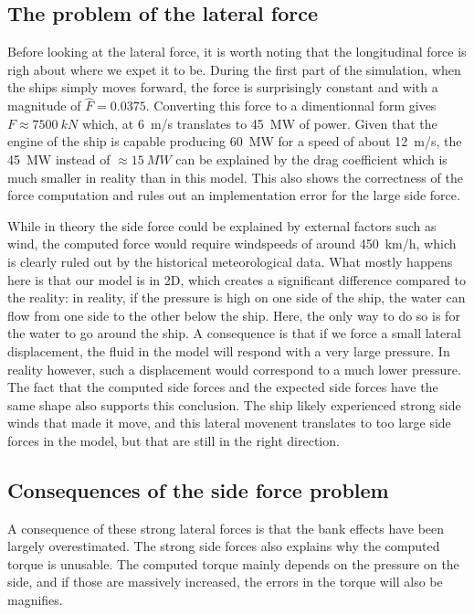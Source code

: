 \documentclass[a4paper]{article}
\begin{document}
\subsection{The problem of the lateral force}
Before looking at the lateral force, it is worth noting that the longitudinal force is righ about where we expet it to be. During the first part of the simulation, when the ships simply moves forward, the force is surprisingly constant and with a magnitude of $\hat{F} = 0.0375$. Converting this force to a dimentionnal form gives $F \approx \SI{7500}{kN}$ which, at \SI{6}{m/s} translates to \SI{45}{MW} of power. Given that the engine of the ship is capable producing \SI{60}{MW} for a speed of about \SI{12}{m/s}, the \SI{45}{MW} instead of $\approx \SI{15}{MW}$ can be explained by the drag coefficient which is much smaller in reality than in this model. This also shows the correctness of the force computation and rules out an implementation error for the large side force.

While in theory the side force could be explained by external factors such as wind, the computed force would require windspeeds of around \SI{450}{km/h}, which is clearly ruled out by the historical meteorological data. What mostly happens here is that our model is in 2D, which creates a significant difference compared to the reality: in reality, if the pressure is high on one side of the ship, the water can flow from one side to the other below the ship. Here, the only way to do so is for the water to go around the ship. A consequence is that if we force a small lateral displacement, the fluid in the model will respond with a very large pressure. In reality however, such a displacement would correspond to a much lower pressure. The fact that the computed side forces and the expected side forces have the same shape also supports this conclusion. The ship likely experienced strong side winds that made it move, and this lateral movenent translates to too large side forces in the model, but that are still in the right direction.

\subsection{Consequences of the side force problem}
A consequence of these strong lateral forces is that the bank effects have been largely overestimated. The strong side forces also explains why the computed torque is unusable. The computed torque mainly depends on the pressure on the side, and if those are massively increased, the errors in the torque will also be magnifies. 
\end{document}
